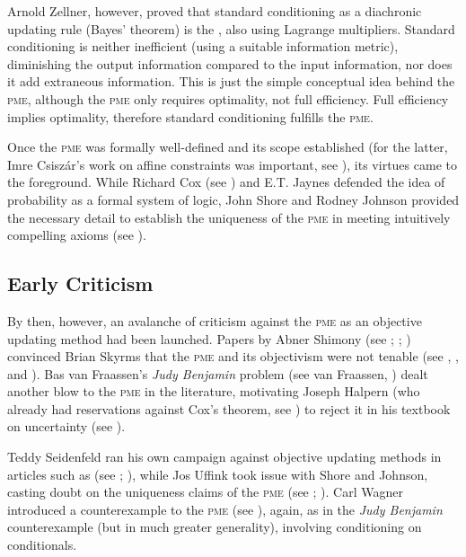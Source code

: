 \documentclass[11pt]{article}
\begin{document}
Arnold Zellner, however, proved that standard conditioning as a
diachronic updating rule (Bayes' theorem) is the  , also using
Lagrange multipliers. Standard conditioning is neither inefficient
(using a suitable information metric), diminishing the output
information compared to the input information, nor does it add
extraneous information. This is just the simple conceptual idea behind
the \textsc{pme}, although the \textsc{pme} only requires optimality,
not full efficiency. Full efficiency implies optimality, therefore
standard conditioning fulfills the \textsc{pme}.

Once the \textsc{pme} was formally well-defined and its scope
established (for the latter, Imre Csisz{\'a}r's work on affine
constraints was important, see ), its virtues
came to the foreground. While Richard Cox (see ) and
E.T. Jaynes defended the idea of probability as a formal system of
logic, John Shore and Rodney Johnson provided the necessary detail to
establish the uniqueness of the \textsc{pme} in meeting intuitively
compelling axioms (see ).

\subsection{Early Criticism}
\label{EarlyCriticism}

By then, however, an avalanche of criticism against the \textsc{pme}
as an objective updating method had been launched. Papers by Abner
Shimony (see ;
; ) convinced Brian
Skyrms that the \textsc{pme} and its objectivism were not tenable (see
, , and
). Bas van Fraassen's \emph{Judy Benjamin}
problem (see van Fraassen, ) dealt another
blow to the \textsc{pme} in the literature, motivating Joseph Halpern
(who already had reservations against Cox's theorem, see
) to reject it in his textbook on uncertainty
(see ).

Teddy Seidenfeld ran his own campaign against objective updating
methods in articles such as 
(see ; ), while Jos
Uffink took issue with Shore and Johnson, casting doubt on the
uniqueness claims of the \textsc{pme} (see ;
). Carl Wagner introduced a counterexample to
the \textsc{pme} (see ), again, as in the \emph{Judy
Benjamin} counterexample (but in much greater generality), involving
conditioning on conditionals.
\end{document}
